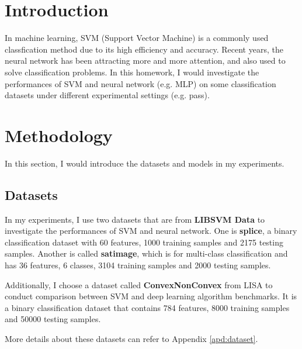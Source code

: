 \documentclass[12pt,a4paper]{article}
\theoremstyle{definition}
\begin{document}
\noindent
\noindent{}

\section{Introduction}

In machine learning, SVM (Support Vector Machine) is a commonly used classfication method due to its high efficiency and accuracy. Recent years, the neural network has been attracting more and more attention, and also used to solve classification problems. In this homework, I would investigate the performances of SVM and neural network (e.g. MLP) on some classification datasets under different experimental settings (e.g. pass).

\section{Methodology}

In this section, I would introduce the datasets and models in my experiments.

\subsection{Datasets}

In my experiments, I use two datasets that are from \textbf{LIBSVM Data} \cite{dataA} to investigate the performances of SVM and neural network. One is \textbf{splice}, a binary classification dataset with 60 features, 1000 training samples and 2175 testing samples. Another is called \textbf{satimage}, which is for multi-class classification and has 36 features, 6 classes, 3104 training samples and 2000 testing samples.

Additionally, I choose a dataset called \textbf{ConvexNonConvex} from LISA \cite{dataB} to conduct comparison between SVM and deep learning algorithm benchmarks. It is a binary classification dataset that contains 784 features, 8000 training samples and 50000 testing samples.

More details about these datasets can refer to Appendix \ref{apd:dataset}.
\end{document}
